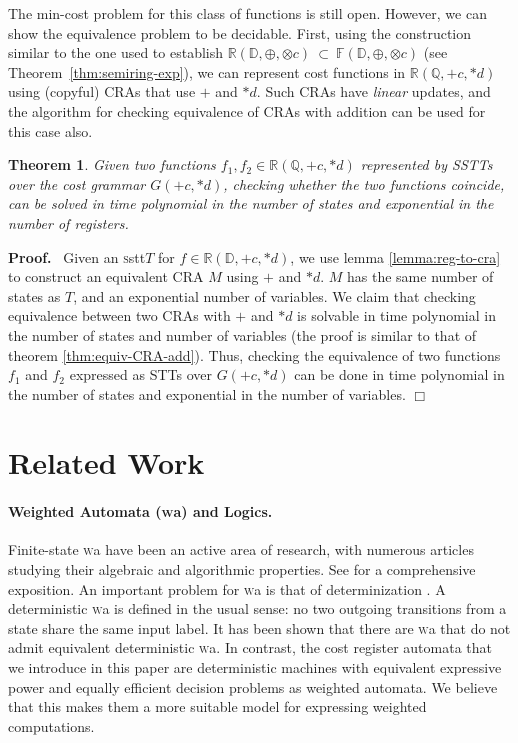 \documentclass[11pt]{article}
\newtheorem{theorem}{Theorem}
\def\Proof{{\bf Proof.}}
\def\qed{{\bf $\Box$}}
\def\qed{{\bf $\Box$}}
\newcommand{\domain}{\ensuremath{\mathbb{D}}}
\newcommand{\Rat}{\ensuremath{\mathbb{Q}}}
\newcommand{\CG}{G}
\newcommand{\CF}{{\mathbb F}}
\newcommand{\reg}[1]{{\mathbb R}(#1)}
\newcommand{\SSTT}{{\sc\textsc sstt}\xspace}
\newcommand{\edwa}{\ensuremath{M}}
\newcommand{\WA}{{\sc\textsc wa}\xspace}
\def\myplus{\otimes}
\def\mytimes{\oplus}
\begin{document}
The min-cost problem for this class of functions is still open.
However, we can show the equivalence problem to be decidable. First,
using the construction similar to the one used to establish
$\reg{\domain,\mytimes,\myplus c}\ \subset\
\CF(\domain,\mytimes,\myplus c)$ (see
Theorem~\ref{thm:semiring-exp}), we can represent cost functions in
$\reg{\Rat,+c,*d}$ using (copyful) CRAs that use $+$ and $*d$. Such
CRAs have {\em linear\/} updates, and the algorithm for checking
equivalence of CRAs with addition can be used for this case also.
\begin{theorem}
Given two functions $f_1,f_2\in \reg{\Rat,+c,*d}$ represented by SSTTs
over the cost grammar $\CG(+c,*d)$, checking whether the two
functions coincide, can be solved in time polynomial in the number
of states and exponential in the number of registers.
\end{theorem}
\Proof~
Given an \SSTT $T$ for $f \in \reg{\domain,+c,*d}$, we use lemma \ref{lemma:reg-to-cra} to construct an equivalent
CRA $\edwa$ using $+$ and $*d$. $\edwa$ has the same number of states as $T$, and an exponential number of variables.
We claim that checking equivalence between two CRAs with $+$ and $*d$ is solvable in time polynomial in the number of
states and number of variables (the proof is similar to that of theorem \ref{thm:equiv-CRA-add}). Thus, checking the equivalence
of two functions $f_1$ and $f_2$ expressed as STTs over $\CG(+c, *d)$ can be done in time polynomial in the number of
states and exponential in the number of variables. \qed


\section{Related Work}\label{sec:rel}
\paragraph{Weighted Automata (\WA) and Logics.}
Finite-state \WA have been an active area of research, with numerous
articles studying their algebraic and algorithmic properties. See
\cite{droste_handbook_2009} for a comprehensive exposition.  An important
problem for \WA is that of determinization \cite{mohri_weighted_2009,
kirsten_determinization_2005}. A deterministic \WA is defined in the usual
sense: no two outgoing transitions from a state share the same input
label.  It has been shown that there are \WA that do not admit equivalent
deterministic \WA. In contrast, the cost register automata that we
introduce in this paper are deterministic machines with equivalent
expressive power and equally efficient decision problems as weighted
automata. We believe that this makes them a more suitable model for
expressing weighted computations.
\end{document}
